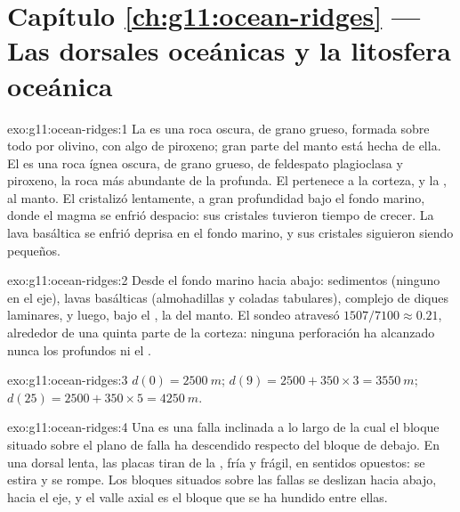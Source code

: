 \section*{Capítulo \ref{ch:g11:ocean-ridges} --- Las dorsales oceánicas y la litosfera oceánica}

\begin{solution}{exo:g11:ocean-ridges:1}
La  es una roca oscura, de grano grueso, formada sobre todo por
olivino, con algo de piroxeno; gran parte del manto está hecha de ella. El
 es una roca ígnea oscura, de grano grueso, de feldespato plagioclasa y
piroxeno, la roca más abundante de la  profunda. El 
pertenece a la corteza, y la , al manto.
El  cristalizó lentamente, a gran profundidad bajo el fondo marino, donde
el magma se enfrió despacio: sus cristales tuvieron tiempo de crecer. La lava
basáltica se enfrió deprisa en el fondo marino, y sus cristales siguieron
siendo pequeños.
\end{solution}

\begin{solution}{exo:g11:ocean-ridges:2}
Desde el fondo marino hacia abajo: sedimentos (ninguno en el eje), lavas
basálticas (almohadillas y coladas tabulares), complejo de diques laminares,
 y luego, bajo el , la  del manto. El sondeo atravesó
$1507/7100 \approx 0.21$, alrededor de una quinta parte de la corteza: ninguna
perforación ha alcanzado nunca los  profundos ni el .
\end{solution}

\begin{solution}{exo:g11:ocean-ridges:3}
$d(0) = \qty{2500}{m}$; $d(9) = 2500 + 350 \times 3 = \qty{3550}{m}$;
$d(25) = 2500 + 350 \times 5 = \qty{4250}{m}$.
\end{solution}

\begin{solution}{exo:g11:ocean-ridges:4}
Una  es una falla inclinada a lo largo de la cual el bloque
situado sobre el plano de falla ha descendido respecto del bloque de debajo.
En una dorsal lenta, las placas tiran de la , fría y frágil, en
sentidos opuestos: se estira y se rompe. Los bloques situados sobre las fallas
se deslizan hacia abajo, hacia el eje, y el valle axial es el bloque que se ha
hundido entre ellas.
\end{solution}

